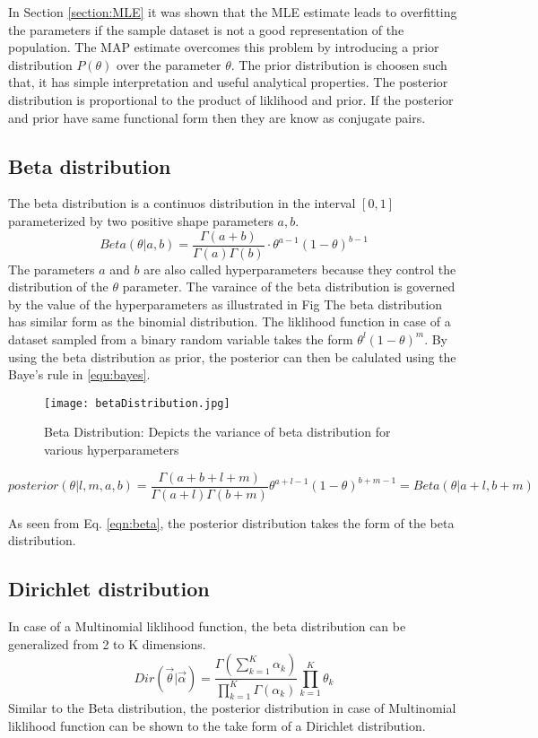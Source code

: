 In Section \ref{section:MLE} it was shown that the MLE estimate leads to overfitting the parameters if the sample dataset is not a good representation of the population. The MAP estimate overcomes this problem by introducing a prior distribution $P(\theta)$ over the parameter $\theta$. The prior distribution is choosen such that, it has simple interpretation and useful analytical properties. The posterior distribution is proportional to the product of liklihood and prior. If the posterior and prior have same functional form then they are know as conjugate pairs. 

\subsection{Beta distribution}
The beta distribution is a continuos distribution in the interval $[0,1]$ parameterized by two positive shape parameters $a,b$.
\begin{equation}
Beta(\theta|a,b) = \frac{\Gamma(a+b)}{\Gamma(a) \Gamma(b)} \cdot \theta^{a-1} (1-\theta)^{b-1}
\end{equation}
The parameters $a$ and $b$ are also called hyperparameters because they control the distribution of the $\theta$ parameter. The varaince of the beta distribution is governed by the value of the hyperparameters as illustrated in Fig  The beta distribution has similar form as the binomial distribution.  The liklihood function in case of a dataset sampled from a binary random variable takes the form $\theta^{l}(1-\theta)^{m}$. By using the beta distribution as prior, the posterior can then be calulated using the Baye's rule in \ref{equ:bayes}.
\begin{figure}
\begin{center}
\texttt{[image: betaDistribution.jpg]}
\caption{Beta Distribution: Depicts the variance of beta distribution for various hyperparameters}
\end{center}
\end{figure}

\begin{equation}
\label{eqn:beta}
posterior(\theta|l,m,a,b) = \frac{\Gamma(a+b+l+m)}{\Gamma(a+l) \Gamma(b+m)} \theta^{a+l-1} (1-\theta)^{b+m-1} = Beta(\theta|a+l,b+m) 
\end{equation}

As seen from Eq. \ref{eqn:beta}, the posterior distribution takes the form of the beta distribution. 

\subsection{Dirichlet distribution}
In case of a Multinomial liklihood function, the beta distribution can be generalized from 2 to K dimensions.
\begin{equation}
Dir(\vec{\theta}|\vec{\alpha}) = \frac{\Gamma(\sum_{k=1}^{K}\alpha_{k})}{\prod_{k=1}^{K}\Gamma(\alpha_{k})}\prod_{k=1}^{K}\theta_{k}
\end{equation}
Similar to the Beta distribution, the posterior distribution in case of Multinomial liklihood function can be shown to the take form of a Dirichlet distribution.